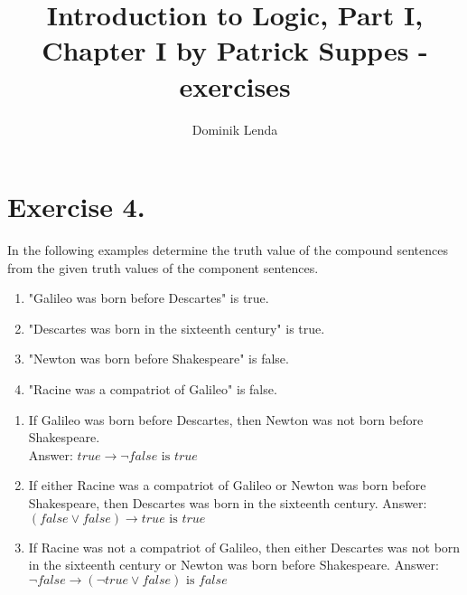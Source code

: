 \documentclass{article}
\title{Introduction to Logic, Part I, Chapter I by Patrick Suppes - exercises}
\author{Dominik Lenda}
\begin{document}
\maketitle

\section*{Exercise 4.}
In the following examples determine the truth value of the compound sentences from the given truth values of the component sentences.
\medskip
\begin{enumerate}[label=(\roman*)]
    \item "Galileo was born before Descartes" is true.
    \item "Descartes was born in the sixteenth century" is true.
    \item "Newton was born before Shakespeare" is false.
    \item "Racine was a compatriot of Galileo" is false.
\end{enumerate}
\medskip
\begin{enumerate}[label=(\alph*)]
    \item If Galileo was born before Descartes, then Newton was not born before Shakespeare.\\
        Answer: $true \rightarrow \neg false \text{ is } true$
    \item If either Racine was a compatriot of Galileo or Newton was born before Shakespeare, then Descartes was born in the sixteenth century.
        Answer: $(false \vee false) \rightarrow true \text{ is } true$ 
    \item If Racine was not a compatriot of Galileo, then either Descartes was not born in the sixteenth century or Newton was born before Shakespeare.
        Answer: $\neg false \rightarrow (\neg true \vee false) \text{ is } false$
\end{enumerate}
\end{document}
